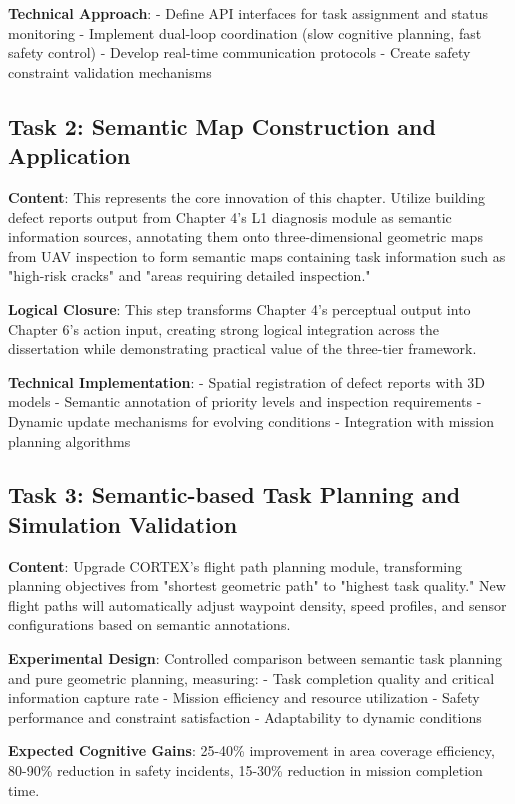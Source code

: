 \textbf{Technical Approach}:
- Define API interfaces for task assignment and status monitoring
- Implement dual-loop coordination (slow cognitive planning, fast safety control)
- Develop real-time communication protocols
- Create safety constraint validation mechanisms

\subsection{Task 2: Semantic Map Construction and Application}

\textbf{Content}: This represents the core innovation of this chapter. Utilize building defect reports output from Chapter 4's L1 diagnosis module as semantic information sources, annotating them onto three-dimensional geometric maps from UAV inspection to form semantic maps containing task information such as "high-risk cracks" and "areas requiring detailed inspection."

\textbf{Logical Closure}: This step transforms Chapter 4's perceptual output into Chapter 6's action input, creating strong logical integration across the dissertation while demonstrating practical value of the three-tier framework.

\textbf{Technical Implementation}:
- Spatial registration of defect reports with 3D models
- Semantic annotation of priority levels and inspection requirements
- Dynamic update mechanisms for evolving conditions
- Integration with mission planning algorithms

\subsection{Task 3: Semantic-based Task Planning and Simulation Validation}

\textbf{Content}: Upgrade CORTEX's flight path planning module, transforming planning objectives from "shortest geometric path" to "highest task quality." New flight paths will automatically adjust waypoint density, speed profiles, and sensor configurations based on semantic annotations.

\textbf{Experimental Design}: Controlled comparison between semantic task planning and pure geometric planning, measuring:
- Task completion quality and critical information capture rate
- Mission efficiency and resource utilization
- Safety performance and constraint satisfaction
- Adaptability to dynamic conditions

\textbf{Expected Cognitive Gains}: 25-40\% improvement in area coverage efficiency, 80-90\% reduction in safety incidents, 15-30\% reduction in mission completion time.

